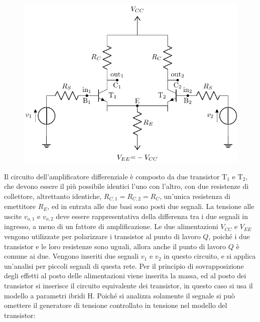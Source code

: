\documentclass{article}
\numberwithin{equation}{subsection}
\begin{document}
\begin{figure}[H]%
    \centering
    \includegraphics{amplificatore-differenziale-2out.pdf}%
\end{figure}
Il circuito dell'amplificatore differenziale è composto da due transistor $\mathrm{T_1}$ e $\mathrm{T_2}$, che devono essere il più possibile identici l'uno con l'altro, con due 
resistenze di collettore, altrettanto identiche, $R_{C,1}=R_{C,2}=R_C$, un'unica resistenza di emettitore $R_E$, ed in entrata alle due basi sono 
posti due segnali. La tensione alle uscite $v_{o,1}$ e $v_{o,2}$ deve essere rappresentativa della differenza tra i due segnali in ingresso, a meno di un 
fattore di amplificazione. 
Le due alimentazioni $V_{CC}$ e $V_{EE}$ vengono utilizzate per polarizzare i transistor al punto di lavoro $Q$, poiché i due transistor e le loro 
resistenze sono uguali, allora anche il punto di lavoro $Q$ è comune ai due. Vengono inseriti due segnali $v_1$ e $v_2$ in questo circuito, e si applica 
un'analisi per piccoli segnali di questa rete. 
Per il principio di 
sovrapposizione degli effetti al posto delle alimentazioni viene inserita la massa, ed al posto dei transistor si inserisce il circuito equivalente dei 
transistor, in questo caso si usa il modello a parametri ibridi H. Poiché si analizza solamente il segnale si può omettere il generatore di tensione 
controllato in tensione nel modello del transistor:
\end{document}
